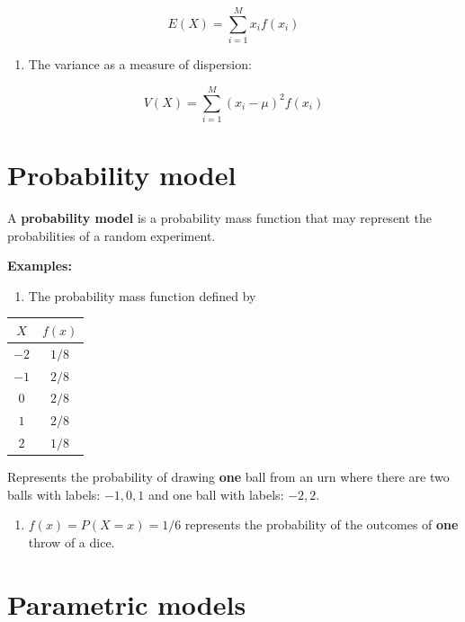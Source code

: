 \documentclass[
]{book}
\providecommand{\tightlist}{%
  \setlength{\itemsep}{0pt}\setlength{\parskip}{0pt}}
\begin{document}
\[E(X)= \sum_{i=1}^M x_i f(x_i)\]

\begin{enumerate}
\def\labelenumi{\arabic{enumi})}
\setcounter{enumi}{1}
\tightlist
\item
  The variance as a measure of dispersion:
\end{enumerate}

\[V(X)= \sum_{i=1}^M (x_i-\mu)^2 f(x_i)\]

\hypertarget{probability-model}{%
\section{Probability model}\label{probability-model}}

A \textbf{probability model} is a probability mass function that may represent the probabilities of a random experiment.

\textbf{Examples:}

\begin{enumerate}
\def\labelenumi{\arabic{enumi})}
\tightlist
\item
  The probability mass function defined by
\end{enumerate}

\begin{longtable}[]{@{}cc@{}}
\toprule\noalign{}
\(X\) & \(f(x)\) \\
\midrule\noalign{}
\endhead
\bottomrule\noalign{}
\endlastfoot
\(-2\) & \(1/8\) \\
\(-1\) & \(2/8\) \\
\(0\) & \(2/8\) \\
\(1\) & \(2/8\) \\
\(2\) & \(1/8\) \\
\end{longtable}

Represents the probability of drawing \textbf{one} ball from an urn where there are two balls with labels: \(-1, 0, 1\) and one ball with labels: \(-2, 2\).

\begin{enumerate}
\def\labelenumi{\arabic{enumi})}
\setcounter{enumi}{1}
\tightlist
\item
  \(f(x)=P(X=x)=1/6\) represents the probability of the outcomes of \textbf{one} throw of a dice.
\end{enumerate}

\hypertarget{parametric-models}{%
\section{Parametric models}\label{parametric-models}}
\end{document}

